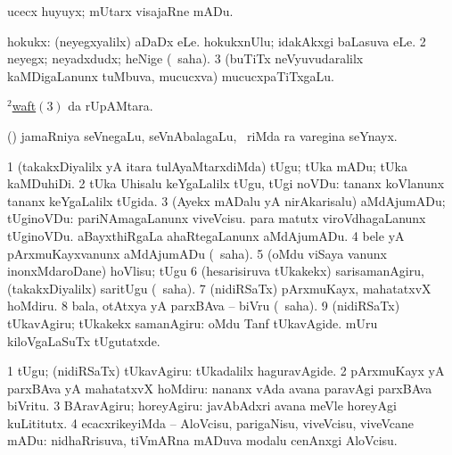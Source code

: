 \bentry
{} 
\gl{\akirx}
\expl{}
\bmng
ucecx huyuyx; mUtarx visajaRne mADu. 
\emng
\eentry

\bentry
{} 
\gl{\saMkiSx}
\expl{}
\bmng
{} 
\emng
\eentry

\bentry
{} 
\gl{\nA}
\expl{}
\bmng
\bnum
{} hokukx: 
\banum
{} (neyegxyalilx) aDaDx eLe. 
 hokukxnUlu; idakAkxgi baLasuva eLe. 
\eanum
\numie
\num{2} neyegx; neyadxdudx; heNige (\rUpa\ saha). 
\num{3} (buTiTx neVyuvudaralilx kaMDigaLanunx tuMbuva, mucucxva) mucucxpaTiTxgaLu. 
\enum
\emng
\eentry

\bentry
{} 
\gl{\nA}
\expl{}
\bmng
\hyperlink{waft(2)3}{$^2$waft\((3)\)} da rUpAMtara. 
\emng
\eentry

\bentry 
{} 
\gl{\nA}
\expl{\G}
\bmng
(\ca) jamaRniya seVnegaLu, seVnAbalagaLu, \kanmu\ riMda ra varegina seYnayx. 
\emng
\eentry

\bentry
{} 
\gl{\sakirx}
\expl{}
\bmng
\bnum
\num{1} (takakxDiyalilx yA itara tulAyaMtarxdiMda) tUgu; tUka mADu; tUka kaMDuhiDi. 
\num{2} tUka Uhisalu keYgaLalilx tUgu, tUgi noVDu:  tananx koVlanunx tananx keYgaLalilx tUgida. 
\num{3} (Ayekx mADalu yA nirAkarisalu) aMdAjumADu; tUginoVDu:  pariNAmagaLanunx viveVcisu.  para matutx viroVdhagaLanunx tUginoVDu.  aBayxthiRgaLa ahaRtegaLanunx aMdAjumADu. 
\num{4} bele yA pArxmuKayxvanunx aMdAjumADu (\akirx\ saha). 
\num{5} (oMdu viSaya \mo vanunx inonxMdaroDane) hoVlisu; tUgu 
\num{6} (hesarisiruva tUkakekx) sarisamanAgiru, (takakxDiyalilx) saritUgu (\akirx\ saha). 
\num{7} (nidiRSaTx) pArxmuKayx, mahatatxvX hoMdiru. 
\num{8} bala, otAtxya yA parxBAva -- biVru (\akirx\ saha). 
\num{9} (nidiRSaTx) tUkavAgiru; tUkakekx samanAgiru:  oMdu Tanf tUkavAgide.  mUru kiloVgaLaSuTx tUgutatxde. 
\enum
\emng

\noindent 
\gl{\akirx}
\expl{}
\bmng
\bnum
\num{1} tUgu; (nidiRSaTx) tUkavAgiru:  tUkadalilx haguravAgide. 
\num{2} pArxmuKayx yA parxBAva yA mahatatxvX hoMdiru:  nananx vAda avana paravAgi parxBAva biVritu. 
\num{3} BAravAgiru; horeyAgiru:  javAbAdxri avana meVle horeyAgi kuLititutx. 
\num{4} ecacxrikeyiMda -- AloVcisu, parigaNisu, viveVcisu, viveVcane mADu:  nidhaRrisuva, tiVmARna mADuva modalu cenAnxgi AloVcisu. 
\enum
\emng

